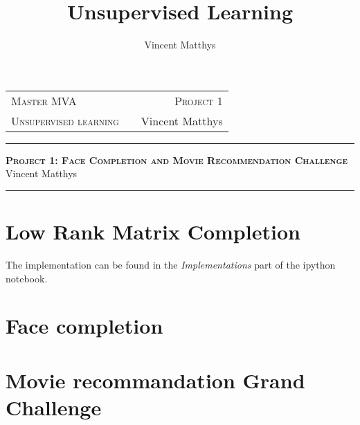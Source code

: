 \documentclass[12pt,a4paper,onecolumn]{article}
\title{Unsupervised Learning}
\author{Vincent Matthys}
\begin{document}
\begin{tabularx}{0.8\textwidth}{@{} l X r @{} }
	{\textsc{Master MVA}}          &  & \textsc{Project 1} \\
	\textsc{Unsupervised learning} &  & {Vincent Matthys}  \\
\end{tabularx}
\vspace{1.5cm}
\begin{center}
	\rule[11pt]{5cm}{0.5pt}

	\textbf{\LARGE \textsc{Project 1: Face Completion and Movie Recommendation Challenge}}
	\vspace{0.5cm}\\
	Vincent Matthys\\
	\rule{5cm}{0.5pt}
	\vspace{1.5cm}
\end{center}

\section{Low Rank Matrix Completion}

The implementation can be found in the \textit{Implementations} part of the ipython notebook.

\section{Face completion}

\section{Movie recommandation Grand Challenge}
\end{document}
